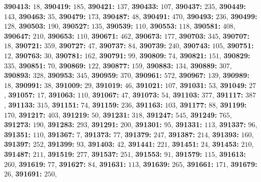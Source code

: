 \textsf{\bfseries 390413:} $18$, \textsf{\bfseries 390419:} $185$, \textsf{\bfseries 390421:} $137$, \textsf{\bfseries 390433:} $107$, \textsf{\bfseries 390437:} $235$, \textsf{\bfseries 390449:} $143$, \textsf{\bfseries 390463:} $35$, \textsf{\bfseries 390479:} $173$, \textsf{\bfseries 390487:} $48$, \textsf{\bfseries 390491:} $470$, \textsf{\bfseries 390493:} $236$, \textsf{\bfseries 390499:} $128$, \textsf{\bfseries 390503:} $190$, \textsf{\bfseries 390527:} $135$, \textsf{\bfseries 390539:} $110$, \textsf{\bfseries 390553:} $118$, \textsf{\bfseries 390581:} $408$, \textsf{\bfseries 390647:} $210$, \textsf{\bfseries 390653:} $110$, \textsf{\bfseries 390671:} $462$, \textsf{\bfseries 390673:} $177$, \textsf{\bfseries 390703:} $345$, \textsf{\bfseries 390707:} $18$, \textsf{\bfseries 390721:} $359$, \textsf{\bfseries 390727:} $47$, \textsf{\bfseries 390737:} $84$, \textsf{\bfseries 390739:} $240$, \textsf{\bfseries 390743:} $105$, \textsf{\bfseries 390751:} $12$, \textsf{\bfseries 390763:} $30$, \textsf{\bfseries 390781:} $162$, \textsf{\bfseries 390791:} $99$, \textsf{\bfseries 390809:} $74$, \textsf{\bfseries 390821:} $151$, \textsf{\bfseries 390829:} $335$, \textsf{\bfseries 390851:} $70$, \textsf{\bfseries 390869:} $122$, \textsf{\bfseries 390877:} $159$, \textsf{\bfseries 390883:} $134$, \textsf{\bfseries 390889:} $307$, \textsf{\bfseries 390893:} $328$, \textsf{\bfseries 390953:} $345$, \textsf{\bfseries 390959:} $370$, \textsf{\bfseries 390961:} $572$, \textsf{\bfseries 390967:} $139$, \textsf{\bfseries 390989:} $18$, \textsf{\bfseries 390991:} $38$, \textsf{\bfseries 391009:} $29$, \textsf{\bfseries 391019:} $46$, \textsf{\bfseries 391021:} $107$, \textsf{\bfseries 391031:} $53$, \textsf{\bfseries 391049:} $27$, \textsf{\bfseries 391057:} $17$, \textsf{\bfseries 391063:} $110$, \textsf{\bfseries 391067:} $47$, \textsf{\bfseries 391073:} $54$, \textsf{\bfseries 391103:} $377$, \textsf{\bfseries 391117:} $387$, \textsf{\bfseries 391133:} $315$, \textsf{\bfseries 391151:} $74$, \textsf{\bfseries 391159:} $236$, \textsf{\bfseries 391163:} $103$, \textsf{\bfseries 391177:} $88$, \textsf{\bfseries 391199:} $170$, \textsf{\bfseries 391217:} $403$, \textsf{\bfseries 391219:} $50$, \textsf{\bfseries 391231:} $318$, \textsf{\bfseries 391247:} $545$, \textsf{\bfseries 391249:} $765$, \textsf{\bfseries 391273:} $190$, \textsf{\bfseries 391283:} $293$, \textsf{\bfseries 391291:} $200$, \textsf{\bfseries 391301:} $95$, \textsf{\bfseries 391331:} $113$, \textsf{\bfseries 391337:} $96$, \textsf{\bfseries 391351:} $110$, \textsf{\bfseries 391367:} $7$, \textsf{\bfseries 391373:} $77$, \textsf{\bfseries 391379:} $247$, \textsf{\bfseries 391387:} $214$, \textsf{\bfseries 391393:} $160$, \textsf{\bfseries 391397:} $252$, \textsf{\bfseries 391399:} $93$, \textsf{\bfseries 391403:} $42$, \textsf{\bfseries 391441:} $221$, \textsf{\bfseries 391451:} $24$, \textsf{\bfseries 391453:} $210$, \textsf{\bfseries 391487:} $211$, \textsf{\bfseries 391519:} $277$, \textsf{\bfseries 391537:} $251$, \textsf{\bfseries 391553:} $91$, \textsf{\bfseries 391579:} $115$, \textsf{\bfseries 391613:} $260$, \textsf{\bfseries 391619:} $77$, \textsf{\bfseries 391627:} $84$, \textsf{\bfseries 391631:} $113$, \textsf{\bfseries 391639:} $265$, \textsf{\bfseries 391661:} $171$, \textsf{\bfseries 391679:} $26$, \textsf{\bfseries 391691:} $250$, 
